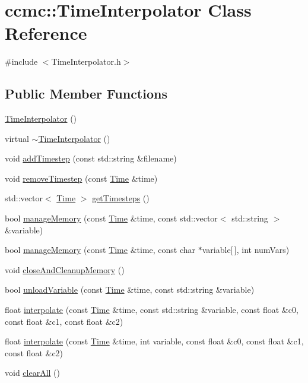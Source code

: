 \hypertarget{classccmc_1_1_time_interpolator}{\section{ccmc\-:\-:Time\-Interpolator Class Reference}
\label{classccmc_1_1_time_interpolator}
}


{\ttfamily \#include $<$Time\-Interpolator.\-h$>$}

\subsection*{Public Member Functions}
\begin{DoxyCompactItemize}
\item 
\hyperlink{classccmc_1_1_time_interpolator_a1c970e027859e2a0bb415e99427ae995}{Time\-Interpolator} ()
\item 
virtual \hyperlink{classccmc_1_1_time_interpolator_ade7807cb2a4e0916bd9014aca1bd0da6}{$\sim$\-Time\-Interpolator} ()
\item 
void \hyperlink{classccmc_1_1_time_interpolator_aaa61a9153116b891697833dfa46d16c9}{add\-Timestep} (const std\-::string \&filename)
\item 
void \hyperlink{classccmc_1_1_time_interpolator_ab8a45909a67aa7a59cca6aad8370f7f4}{remove\-Timestep} (const \hyperlink{classccmc_1_1_time}{Time} \&time)
\item 
std\-::vector$<$ \hyperlink{classccmc_1_1_time}{Time} $>$ \hyperlink{classccmc_1_1_time_interpolator_abaed778bc6352cb106dc0a1789a66ae7}{get\-Timesteps} ()
\item 
bool \hyperlink{classccmc_1_1_time_interpolator_a8fd3680bc1579890ea62c41145d5422f}{manage\-Memory} (const \hyperlink{classccmc_1_1_time}{Time} \&time, const std\-::vector$<$ std\-::string $>$ \&variable)
\item 
bool \hyperlink{classccmc_1_1_time_interpolator_a004a7a3560ca12234a43a481e6b56d07}{manage\-Memory} (const \hyperlink{classccmc_1_1_time}{Time} \&time, const char $\ast$variable\mbox{[}$\,$\mbox{]}, int num\-Vars)
\item 
void \hyperlink{classccmc_1_1_time_interpolator_ab1063eb20024f1f3e9923b1cff0a4060}{close\-And\-Cleanup\-Memory} ()
\item 
bool \hyperlink{classccmc_1_1_time_interpolator_a0f7f53969a22a1641926762ec838d7e4}{unload\-Variable} (const \hyperlink{classccmc_1_1_time}{Time} \&time, const std\-::string \&variable)
\item 
float \hyperlink{classccmc_1_1_time_interpolator_ab80987872d9d6d58c49d30a86e499e86}{interpolate} (const \hyperlink{classccmc_1_1_time}{Time} \&time, const std\-::string \&variable, const float \&c0, const float \&c1, const float \&c2)
\item 
float \hyperlink{classccmc_1_1_time_interpolator_ac8a3ca21476a05edf2ea427369266505}{interpolate} (const \hyperlink{classccmc_1_1_time}{Time} \&time, int variable, const float \&c0, const float \&c1, const float \&c2)
\item 
void \hyperlink{classccmc_1_1_time_interpolator_a6295ebae47e50a0d80fd646a294d4ccd}{clear\-All} ()
\end{DoxyCompactItemize}

